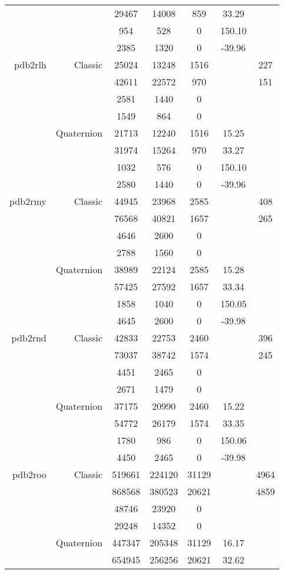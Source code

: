 \begin{xltabular}{\textwidth}{r|rcccSc}
& & 29467 & 14008 & 859 & 33.29 & \\
& & 954 & 528 & 0 & 150.10 & \\
& & 2385 & 1320 & 0 & -39.96 & \\ \addlinespace
pdb2rlh & Classic & 25024 & 13248 & 1516 & & 227 \\
& & 42611 & 22572 & 970 & & 151 \\
& & 2581 & 1440 & 0 & & \\
& & 1549 & 864 & 0 & & \\
& Quaternion & 21713 & 12240 & 1516 & 15.25 & \\
& & 31974 & 15264 & 970 & 33.27 & \\
& & 1032 & 576 & 0 & 150.10 & \\
& & 2580 & 1440 & 0 & -39.96 & \\ \addlinespace
pdb2rmy & Classic & 44945 & 23968 & 2585 & & 408 \\
& & 76568 & 40821 & 1657 & & 265 \\
& & 4646 & 2600 & 0 & & \\
& & 2788 & 1560 & 0 & & \\
& Quaternion & 38989 & 22124 & 2585 & 15.28 & \\
& & 57425 & 27592 & 1657 & 33.34 & \\
& & 1858 & 1040 & 0 & 150.05 & \\
& & 4645 & 2600 & 0 & -39.98 & \\ \addlinespace
pdb2rnd & Classic & 42833 & 22753 & 2460 & & 396 \\
& & 73037 & 38742 & 1574 & & 245 \\
& & 4451 & 2465 & 0 & & \\
& & 2671 & 1479 & 0 & & \\
& Quaternion & 37175 & 20990 & 2460 & 15.22 & \\
& & 54772 & 26179 & 1574 & 33.35 & \\
& & 1780 & 986 & 0 & 150.06 & \\
& & 4450 & 2465 & 0 & -39.98 & \\ \addlinespace
pdb2roo & Classic & 519661 & 224120 & 31129 & & 4964 \\
& & 868568 & 380523 & 20621 & & 4859 \\
& & 48746 & 23920 & 0 & & \\
& & 29248 & 14352 & 0 & & \\
& Quaternion & 447347 & 205348 & 31129 & 16.17 & \\
& & 654945 & 256256 & 20621 & 32.62 & \\

\end{xltabular}
